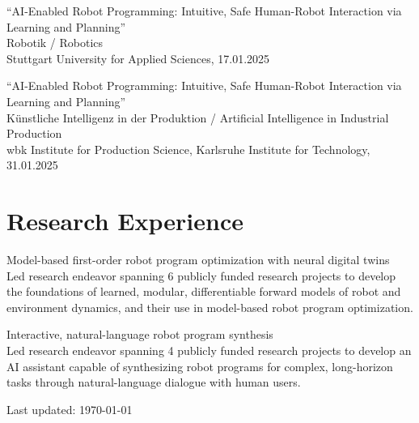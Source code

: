 \documentclass[11pt]{article} %
\begin{document}

``AI-Enabled Robot Programming: Intuitive, Safe Human-Robot Interaction via Learning and Planning''\\
Robotik / Robotics\\
Stuttgart University for Applied Sciences, 17.01.2025

\medskip

``AI-Enabled Robot Programming: Intuitive, Safe Human-Robot Interaction via Learning and Planning''\\
Künstliche Intelligenz in der Produktion / Artificial Intelligence in Industrial Production\\
wbk Institute for Production Science, Karlsruhe Institute for Technology, 31.01.2025


\section*{Research Experience}

Model-based first-order robot program optimization with neural digital twins\\
Led research endeavor spanning 6 publicly funded research projects to develop the foundations of learned, modular, differentiable forward models of robot and environment dynamics, and their use in model-based robot program optimization.

Interactive, natural-language robot program synthesis\\
Led research endeavor spanning 4 publicly funded research projects to develop an AI assistant capable of synthesizing robot programs for complex, long-horizon tasks through natural-language dialogue with human users.


\vfill %


\begin{center}
	\scriptsize
	Last updated: \today
\end{center}

\end{document}
